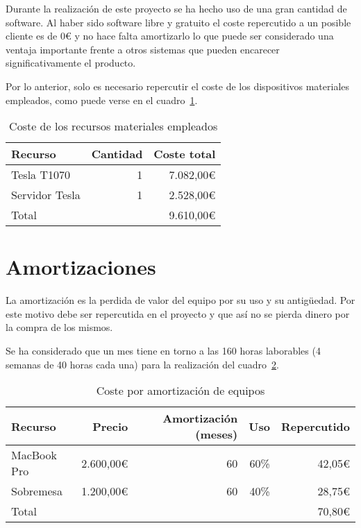 Durante la realización de este proyecto se ha hecho uso de una gran cantidad de software. Al haber sido software libre y gratuito el coste repercutido a un posible cliente es de 0\euro{} y no hace falta amortizarlo lo que puede ser considerado una ventaja importante frente a otros sistemas que pueden encarecer significativamente el producto.

Por lo anterior, solo es necesario repercutir el coste de los dispositivos materiales empleados, como puede verse en el cuadro~\ref{tab:re_mat}.

\begin{table}
	\centering
	
	\begin{tabular}{|l|r|r|}
		\hline
		Recurso & Cantidad & Coste total \\
		\hline
		Tesla T1070 & 1 & 7.082,00\euro \\
		\hline
		Servidor Tesla & 1 & 2.528,00\euro\\
		\hline
		\hline
		\multicolumn{2}{|l|}{Total} & 9.610,00\euro\\
		\hline
	\end{tabular}
	\caption{Coste de los recursos materiales empleados}\label{tab:re_mat}
\end{table}

\section{Amortizaciones}

La amortización es la perdida de valor del equipo por su uso y su antigüedad. Por este motivo debe ser repercutida en el proyecto y que así no se pierda dinero por la compra de los mismos.

Se ha considerado que un mes tiene en torno a las 160 horas laborables (4 semanas de 40 horas cada una) para la realización del cuadro~\ref{tab:amortizacion}.

\begin{table}
	\centering
	
	\begin{tabular}{|l|r|r|r|r|}
		\hline
		Recurso & Precio & Amortización (meses) & Uso & Repercutido\\
		\hline
		MacBook Pro & 2.600,00\euro & 60 & 60\% & 42,05\euro \\
		\hline
		Sobremesa & 1.200,00\euro & 60 & 40\% & 28,75\euro \\
		\hline
		\hline
		\multicolumn{4}{|l|}{Total} & 70,80\euro\\
		\hline
	\end{tabular}
	\caption{Coste por amortización de equipos}\label{tab:amortizacion}
\end{table}

